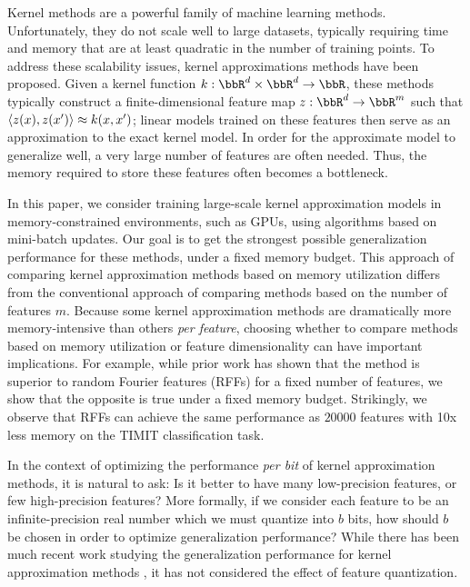 
Kernel methods are a powerful family of machine learning methods.  Unfortunately, they do not scale well to large datasets, typically requiring time and memory that are at least quadratic in the number of training points. To address these scalability issues, kernel approximations methods have been proposed. Given a kernel function $k:\RR^d\times\RR^d\rightarrow \RR$, these methods typically construct a finite-dimensional feature map $z: \RR^d \rightarrow \RR^m$ such that $\langle z(x),z(x') \rangle \approx k(x,x')$; linear models trained on these features then serve as an approximation to the exact kernel model. In order for the approximate model to generalize well, a very large number of features are often needed. Thus, the memory required to store these features often becomes a bottleneck.

In this paper, we consider training large-scale kernel approximation models in memory-constrained environments, such as GPUs, using algorithms based on mini-batch updates. Our goal is to get the strongest possible generalization performance for these methods, under a fixed memory budget. This approach of comparing kernel approximation methods based on memory utilization differs from the conventional approach of comparing methods based on the number of features $m$. Because some kernel approximation methods are dramatically more memory-intensive than others \textit{per feature}, choosing whether to compare methods based on memory utilization or feature dimensionality can have important implications. For example, while prior work \citep{nysvsrff12} has shown that the \Nystrom method \citep{nystrom} is superior to random Fourier features (RFFs) \citep{rahimi07random} for a fixed number of features, we show that the opposite is true under a fixed memory budget.  Strikingly, we observe that RFFs can achieve the same performance as $\num[group-separator={,}]{20000}$ \Nystrom features with 10x less memory on the TIMIT classification task.

In the context of optimizing the performance \textit{per bit} of kernel approximation methods, it is natural to ask: Is it better to have many low-precision features, or few high-precision features? More formally, if we consider each feature to be an infinite-precision real number which we must quantize into $b$ bits, how should $b$ be chosen in order to optimize generalization performance? While there has been much recent work studying the generalization performance for kernel approximation methods \citep{rudi17,avron17,musco17,bach17}, it has not considered the effect of feature quantization.

